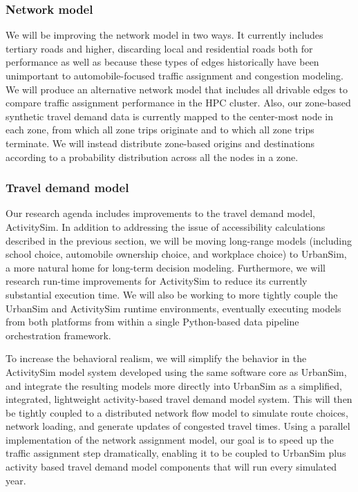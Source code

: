 \subsubsection{Network model}

We will be improving the network model in two ways. It currently includes tertiary roads and higher, discarding local and residential roads both for performance as well as because these types of edges historically have been unimportant to automobile-focused traffic assignment and congestion modeling. We will produce an alternative network model that includes all drivable edges to compare traffic assignment performance in the HPC cluster. Also, our zone-based synthetic travel demand data is currently mapped to the center-most node in each zone, from which all zone trips originate and to which all zone trips terminate. We will instead distribute zone-based origins and destinations according to a probability distribution across all the nodes in a zone.

\subsubsection{Travel demand model}

Our research agenda includes improvements to the travel demand model, ActivitySim. In addition to addressing the issue of accessibility calculations described in the previous section, we will be moving long-range models (including school choice, automobile ownership choice, and workplace choice) to UrbanSim, a more natural home for long-term decision modeling. Furthermore, we will research run-time improvements for ActivitySim to reduce its currently substantial execution time. We will also be working to more tightly couple the UrbanSim and ActivitySim runtime environments, eventually executing models from both platforms from within a single Python-based data pipeline orchestration framework. 

To increase the behavioral realism, we will simplify the behavior in the ActivitySim model system developed using the same software core as UrbanSim, and integrate the resulting models more directly into UrbanSim as a simplified, integrated, lightweight activity-based travel demand model system. This will then be tightly coupled to a distributed network flow model to simulate route choices, network loading, and generate updates of congested travel times. Using a parallel implementation of the network assignment model, our goal is to speed up the traffic assignment step dramatically, enabling it to be coupled to UrbanSim plus activity based travel demand model components that will run every simulated year.

